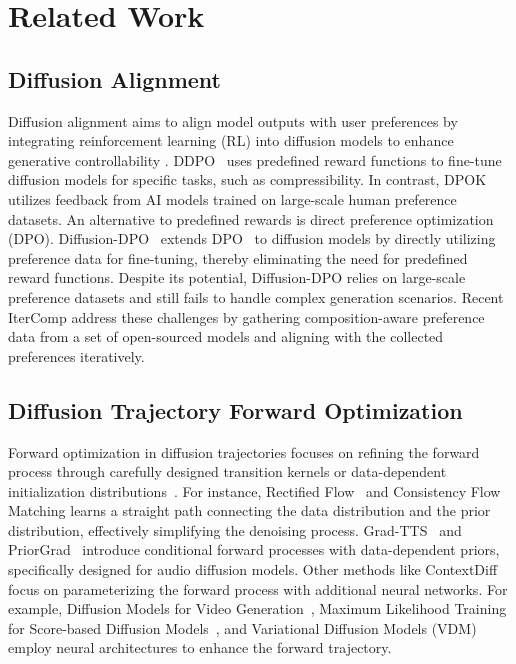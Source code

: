 \section{Related Work}
\subsection{Diffusion Alignment}
Diffusion alignment aims to align model outputs with user preferences by integrating reinforcement learning (RL) into diffusion models to enhance generative controllability \citep{wallace2024diffusion,xu2024imagereward,zhang2025itercomp,ueharafeedback,yang2024using}. DDPO~\citep{black2024training} uses predefined reward functions to fine-tune diffusion models for specific tasks, such as compressibility. In contrast, DPOK~\citep{fan2024reinforcement} utilizes feedback from AI models trained on large-scale human preference datasets. 
An alternative to predefined rewards is direct preference optimization (DPO). 
Diffusion-DPO~\citep{wallace2024diffusion} extends DPO~\citep{clark2024directly} to diffusion models by directly utilizing preference data for fine-tuning, thereby eliminating the need for predefined reward functions. Despite its potential, Diffusion-DPO relies on large-scale preference datasets and still fails to handle complex generation scenarios.
Recent IterComp \citep{zhang2024itercomp} address these challenges by gathering composition-aware preference data from a set of open-sourced models and aligning with the collected preferences iteratively.

\subsection{Diffusion Trajectory Forward Optimization}
Forward optimization in diffusion trajectories focuses on refining the forward process through carefully designed transition kernels or data-dependent initialization distributions~\citep{liu2022flow,hoogeboom2022blurring,dockhorn2021score,lee2021priorgrad,karras2022elucidating,yang2024cross}. For instance, Rectified Flow~\citep{liu2022flow} and Consistency Flow Matching \citep{yang2024consistency} learns a straight path connecting the data distribution and the prior distribution, effectively simplifying the denoising process. Grad-TTS~\citep{popov2021grad} and PriorGrad~\citep{lee2021priorgrad} introduce conditional forward processes with data-dependent priors, specifically designed for audio diffusion models. Other methods like ContextDiff \citep{yang2024cross} focus on parameterizing the forward process with additional neural networks. For example, Diffusion Models for Video Generation~\citep{zhang2021diffusion}, Maximum Likelihood Training for Score-based Diffusion Models~\citep{kim2022maximum}, and Variational Diffusion Models (VDM)~\citep{kingma2021variational} employ neural architectures to enhance the forward trajectory. 

